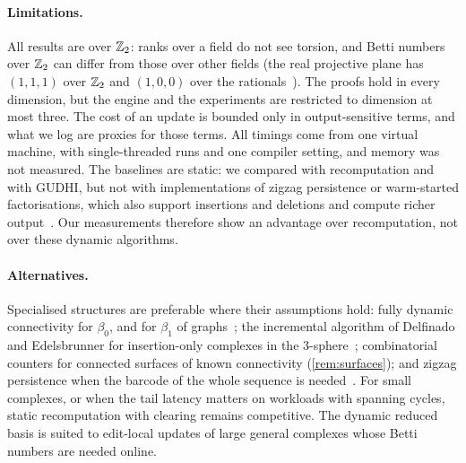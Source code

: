 \paragraph{Limitations.}
All results are over $\mathbb{Z}_2$: ranks over a field do not see torsion, and Betti
numbers over $\mathbb{Z}_2$ can differ from those over other fields (the real projective
plane has $(1,1,1)$ over $\mathbb{Z}_2$ and $(1,0,0)$ over the
rationals~\cite{hatcher2002algebraic}). The proofs hold in every dimension, but
the engine and the experiments are restricted to dimension at most three. The
cost of an update is bounded only in output-sensitive terms, and what we log are
proxies for those terms. All timings come from one virtual machine, with
single-threaded runs and one compiler setting, and memory was not measured.
The baselines are static: we compared with recomputation and with GUDHI, but not
with implementations of zigzag persistence or warm-started factorisations, which
also support insertions and deletions and compute richer
output~\cite{carlsson2009zigzag,luo2023warmstart}. Our measurements therefore
show an advantage over recomputation, not over these dynamic algorithms.

\paragraph{Alternatives.}
Specialised structures are preferable where their assumptions hold: fully
dynamic connectivity for $\beta_0$, and for $\beta_1$ of
graphs~\cite{holm2001polylog}; the incremental algorithm of Delfinado and
Edelsbrunner for insertion-only complexes in the
$3$-sphere~\cite{delfinado1995incremental}; combinatorial counters for
connected surfaces of known connectivity (\cref{rem:surfaces}); and zigzag
persistence when the barcode of the whole sequence is
needed~\cite{carlsson2010zigzag}. For small complexes, or when the tail latency
matters on workloads with spanning cycles, static recomputation with clearing
remains competitive. The dynamic reduced basis is suited to edit-local updates
of large general complexes whose Betti numbers are needed online.
